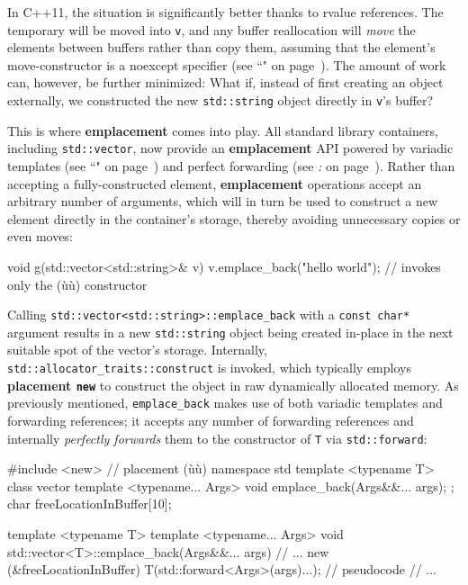 In C++11, the situation is significantly better thanks to
rvalue references. The temporary will be moved into
\texttt{v}, and any buffer reallocation will \emph{move} the elements
between buffers rather than copy them, assuming that the element's
move-constructor is a noexcept specifier (see ``" on page~\pageref{noexcept-specifier}). The amount of work
can, however, be further minimized: What if, instead of first creating
an object externally, we constructed the new \texttt{std::string} object
directly in \texttt{v}'s buffer?

This is where \textbf{emplacement} comes into play. All standard library
containers, including \texttt{std::vector}, now provide an
\textbf{emplacement} API powered by variadic templates (see ``" on page~\pageref{variadictemplate})
and perfect forwarding (see \textit{: } on page~\pageref{perfect-forwarding-for-generic-factory-functions}). Rather than accepting a
fully-constructed element, \textbf{emplacement} operations accept an
arbitrary number of arguments, which will in turn be used to construct a
new element directly in the container's storage, thereby avoiding
unnecessary copies or even moves:

\begin{emcppslisting}[emcppsbatch=e11]
void g(std::vector<std::string>& v)
{
    v.emplace_back("hello world");
        // invokes only the (ù{}ù) constructor
}
\end{emcppslisting}

\noindent Calling \texttt{std::vector<std::string>::emplace\_back} with a
\texttt{const}~\texttt{char*} argument results in a new
\texttt{std::string} object being created in-place in the next suitable
spot of the vector's storage. Internally,
\texttt{std::allocator\_traits::construct} is invoked, which typically
employs \textbf{placement \texttt{new}} to construct the object in raw
dynamically allocated memory. As previously mentioned,
\texttt{emplace\_back} makes use of both variadic
templates and forwarding references; it accepts any
number of forwarding references and internally \textit{perfectly forwards} them
to the constructor of \texttt{T} via \texttt{std::forward}:

\begin{emcppshiddenlisting}[emcppsbatch=e12]
#include <new>     // placement (ù{}ù)
namespace std {
template <typename T>
class vector {
    template <typename... Args>
    void emplace_back(Args&&... args);
};
char freeLocationInBuffer[10];
}
\end{emcppshiddenlisting}
\begin{emcppslisting}[emcppsbatch=e12]
template <typename T>
template <typename... Args>
void std::vector<T>::emplace_back(Args&&... args)
{
    // ...
    new (&freeLocationInBuffer) T(std::forward<Args>(args)...);  // pseudocode
    // ...
}
\end{emcppslisting}

